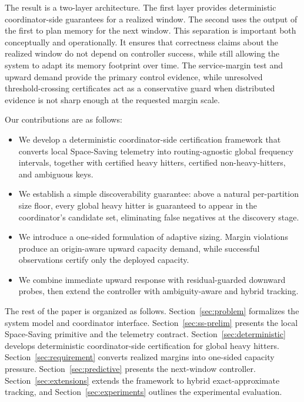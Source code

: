 \documentclass[sigconf, nonacm]{acmart}
\begin{document}
The result is a two-layer architecture. The first layer provides deterministic coordinator-side guarantees for a realized window. The second uses the output of the first to plan memory for the next window. This separation is important both conceptually and operationally. It ensures that correctness claims about the realized window do not depend on controller success, while still allowing the system to adapt its memory footprint over time. The service-margin test and upward demand provide the primary control evidence, while unresolved threshold-crossing certificates act as a conservative guard when distributed evidence is not sharp enough at the requested margin scale.

Our contributions are as follows:
\begin{itemize}[leftmargin=*]
    \item We develop a deterministic coordinator-side certification framework that converts local Space-Saving telemetry into routing-agnostic global frequency intervals, together with certified heavy hitters, certified non-heavy-hitters, and ambiguous keys.
    \item We establish a simple discoverability guarantee: above a natural per-partition size floor, every global heavy hitter is guaranteed to appear in the coordinator's candidate set, eliminating false negatives at the discovery stage.
    \item We introduce a one-sided formulation of adaptive sizing. Margin violations produce an origin-aware upward capacity demand, while successful observations certify only the deployed capacity.
    \item We combine immediate upward response with residual-guarded downward probes, then extend the controller with ambiguity-aware and hybrid tracking.
\end{itemize}

The rest of the paper is organized as follows. Section~\ref{sec:problem} formalizes the system model and coordinator interface. Section~\ref{sec:ss-prelim} presents the local Space-Saving primitive and the telemetry contract. Section~\ref{sec:deterministic} develops deterministic coordinator-side certification for global heavy hitters. Section~\ref{sec:requirement} converts realized margins into one-sided capacity pressure. Section~\ref{sec:predictive} presents the next-window controller. Section~\ref{sec:extensions} extends the framework to hybrid exact-approximate tracking, and Section~\ref{sec:experiments} outlines the experimental evaluation.
\end{document}
